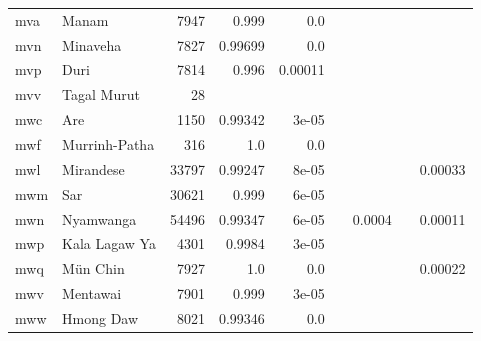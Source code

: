\documentclass[11pt]{article}
\begin{document}
\begin{table*}[h]
{\begin{tabular}{llrrrrrrr}
mva         & Manam         & 7947         & 0.999         & 0.0         &          &          &          &          \\

mvn         & Minaveha         & 7827         & 0.99699         & 0.0         &          &          &          &          \\

mvp         & Duri         & 7814         & 0.996         & 0.00011         &          &          &          &          \\

mvv         & Tagal Murut         & 28         &          &          &          &          &          &          \\

mwc         & Are         & 1150         & 0.99342         & 3e-05         &          &          &          &          \\

mwf         & Murrinh-Patha         & 316         & 1.0         & 0.0         &          &          &          &          \\

mwl         & Mirandese         & 33797         & 0.99247         & 8e-05         &          &          &          & 0.00033         \\

mwm         & Sar         & 30621         & 0.999         & 6e-05         &          &          &          &          \\

mwn         & Nyamwanga         & 54496         & 0.99347         & 6e-05         &          & 0.0004         &          & 0.00011         \\

mwp         & Kala Lagaw Ya         & 4301         & 0.9984         & 3e-05         &          &          &          &          \\

mwq         & Mün Chin         & 7927         & 1.0         & 0.0         &          &          &          & 0.00022         \\

mwv         & Mentawai         & 7901         & 0.999         & 3e-05         &          &          &          &          \\

mww         & Hmong Daw         & 8021         & 0.99346         & 0.0         &          &          &          &          \\


\end{tabular}}
\end{table*}
\end{document}
